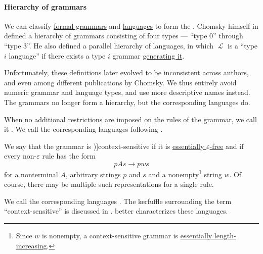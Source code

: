 \paragraph{Hierarchy of grammars}

\begin{definition}\label{def:chomsky_hierarchy}
  We can classify \hyperref[def:formal_grammar]{formal grammars} and \hyperref[def:formal_language]{languages} to form the . Chomsky himself in \cite[def. 6]{Chomsky1959Grammars} defined a hierarchy of grammars consisting of four types --- \enquote{type 0} through \enquote{type 3}. He also defined a parallel hierarchy of languages, in which \( \mscrL \) is a \enquote{type \( i \) language} if there exists a type \( i \) grammar \hyperref[def:formal_grammar/language]{generating it}.

  Unfortunately, these definitions later evolved to be inconsistent across authors, and even among different publications by Chomsky. We thus entirely avoid numeric grammar and language types, and use more descriptive names instead. The grammars no longer form a hierarchy, but the corresponding languages do.

  \begin{thmenum}
     When no additional restrictions are imposed on the rules of the grammar, we call it . We call the corresponding languages  following \cite[thm 5.4.1; thm 5.4.2]{Savage2008Computability}.

     We say that the grammar is \term[ru=грамматика составляющих (\cite[29]{Гладкий1973Языки})]{context-sensitive} if it is \hyperref[def:epsilon_free_grammar]{essentially \( \varepsilon \)-free} and if every non-\( \varepsilon \) rule has the form
    \begin{equation*}
      p A s \to p w s
    \end{equation*}
    for a nonterminal \( A \), arbitrary strings \( p \) and \( s \) and a nonempty\footnote{Since \( w \) is nonempty, a context-sensitive grammar is \hyperref[def:length_increasing_grammar]{essentially length-increasing}.} string \( w \). Of course, there may be multiple such representations for a single rule.

    We call the corresponding languages . The kerfuffle surrounding the term \enquote{context-sensitive} is discussed in .  better characterizes these languages.


\end{thmenum}
\end{definition}
